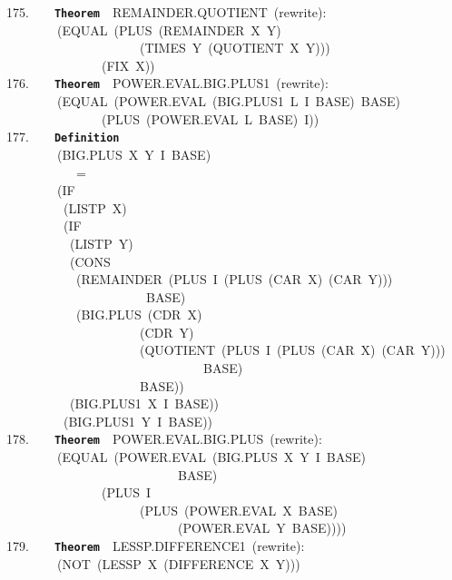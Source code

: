 \documentclass[11pt]{book}
\newenvironment{pubasis}{\begin{flushleft}\ttfamily\small}{\normalsize\rmfamily\end{flushleft}}
\newcommand{\axiomordefinition}[1]{\vspace{6pt}\texttt{\textbf{#1}}}
\begin{document}
\begin{pubasis}
175.~~~~\axiomordefinition{Theorem}~~REMAINDER.QUOTIENT~(rewrite):\\
~~~~~~~~(EQUAL~(PLUS~(REMAINDER~X~Y)\\
~~~~~~~~~~~~~~~~~~~~~(TIMES~Y~(QUOTIENT~X~Y)))\\
~~~~~~~~~~~~~~~(FIX~X))\\

176.~~~~\axiomordefinition{Theorem}~~POWER.EVAL.BIG.PLUS1~(rewrite):\\
~~~~~~~~(EQUAL~(POWER.EVAL~(BIG.PLUS1~L~I~BASE)~BASE)\\
~~~~~~~~~~~~~~~(PLUS~(POWER.EVAL~L~BASE)~I))\\

177.~~~~\axiomordefinition{Definition}\\
~~~~~~~~(BIG.PLUS~X~Y~I~BASE)\\
~~~~~~~~~~~=\\
~~~~~~~~(IF\\
~~~~~~~~~(LISTP~X)\\
~~~~~~~~~(IF\\
~~~~~~~~~~(LISTP~Y)\\
~~~~~~~~~~(CONS\\
~~~~~~~~~~~(REMAINDER~(PLUS~I~(PLUS~(CAR~X)~(CAR~Y)))\\
~~~~~~~~~~~~~~~~~~~~~~BASE)\\
~~~~~~~~~~~(BIG.PLUS~(CDR~X)\\
~~~~~~~~~~~~~~~~~~~~~(CDR~Y)\\
~~~~~~~~~~~~~~~~~~~~~(QUOTIENT~(PLUS~I~(PLUS~(CAR~X)~(CAR~Y)))\\
~~~~~~~~~~~~~~~~~~~~~~~~~~~~~~~BASE)\\
~~~~~~~~~~~~~~~~~~~~~BASE))\\
~~~~~~~~~~(BIG.PLUS1~X~I~BASE))\\
~~~~~~~~~(BIG.PLUS1~Y~I~BASE))\\

178.~~~~\axiomordefinition{Theorem}~~POWER.EVAL.BIG.PLUS~(rewrite):\\
~~~~~~~~(EQUAL~(POWER.EVAL~(BIG.PLUS~X~Y~I~BASE)\\
~~~~~~~~~~~~~~~~~~~~~~~~~~~BASE)\\
~~~~~~~~~~~~~~~(PLUS~I\\
~~~~~~~~~~~~~~~~~~~~~(PLUS~(POWER.EVAL~X~BASE)\\
~~~~~~~~~~~~~~~~~~~~~~~~~~~(POWER.EVAL~Y~BASE))))\\

179.~~~~\axiomordefinition{Theorem}~~LESSP.DIF\-FER\-ENCE1~(rewrite):\\
~~~~~~~~(NOT~(LESSP~X~(DIFFERENCE~X~Y)))\\


\end{pubasis}
\end{document}
